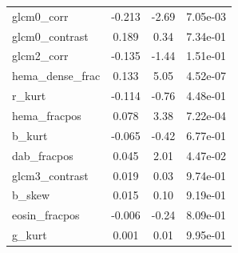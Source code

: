 \begin{longtable}{lccc}
glcm0\_corr & -0.213 & -2.69 & 7.05e-03 \\
glcm0\_contrast & 0.189 & 0.34 & 7.34e-01 \\
glcm2\_corr & -0.135 & -1.44 & 1.51e-01 \\
hema\_dense\_frac & 0.133 & 5.05 & 4.52e-07 \\
r\_kurt & -0.114 & -0.76 & 4.48e-01 \\
hema\_fracpos & 0.078 & 3.38 & 7.22e-04 \\
b\_kurt & -0.065 & -0.42 & 6.77e-01 \\
dab\_fracpos & 0.045 & 2.01 & 4.47e-02 \\
glcm3\_contrast & 0.019 & 0.03 & 9.74e-01 \\
b\_skew & 0.015 & 0.10 & 9.19e-01 \\
eosin\_fracpos & -0.006 & -0.24 & 8.09e-01 \\
g\_kurt & 0.001 & 0.01 & 9.95e-01 \\
\bottomrule
\end{longtable}
